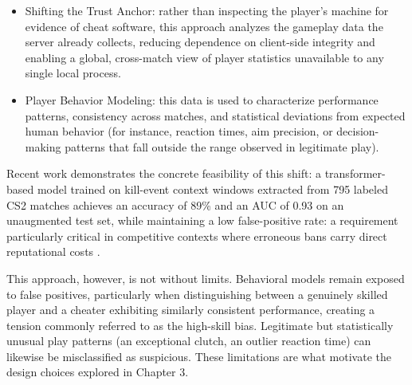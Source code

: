\begin{itemize}
    \item Shifting the Trust Anchor: rather than inspecting the player's machine for evidence of cheat software, this approach analyzes the gameplay data the server already collects, reducing dependence on client-side integrity and enabling a global, cross-match view of player statistics unavailable to any single local process.
    \item Player Behavior Modeling: this data is used to characterize performance patterns, consistency across matches, and statistical deviations from expected human behavior (for instance, reaction times, aim precision, or decision-making patterns that fall outside the range observed in legitimate play).
\end{itemize}

Recent work demonstrates the concrete feasibility of this shift: a transformer-based model trained on kill-event context windows extracted from 795 labeled CS2 matches achieves an accuracy of 89\% and an AUC of 0.93 on an unaugmented test set, while maintaining a low false-positive rate: a requirement particularly critical in competitive contexts where erroneous bans carry direct reputational costs \cite{Loo2025}.

This approach, however, is not without limits. Behavioral models remain exposed to false positives, particularly when distinguishing between a genuinely skilled player and a cheater exhibiting similarly consistent performance, creating a tension commonly referred to as the high-skill bias. Legitimate but statistically unusual play patterns (an exceptional clutch, an outlier reaction time) can likewise be misclassified as suspicious. These limitations are what motivate the design choices explored in Chapter 3.

